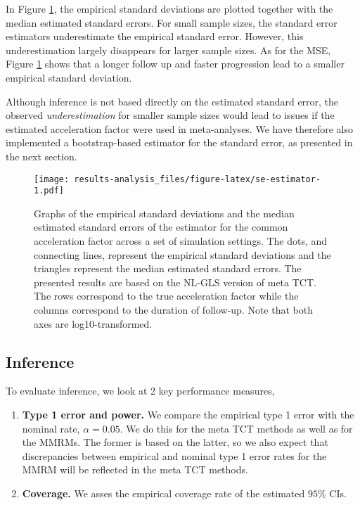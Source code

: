 \documentclass[
]{article}
\providecommand{\tightlist}{%
  \setlength{\itemsep}{0pt}\setlength{\parskip}{0pt}}
\begin{document}
In Figure \ref{fig:se-estimator}, the empirical standard deviations are plotted
together with the median estimated standard errors. For small sample sizes, the
standard error estimators underestimate the empirical standard error. However,
this underestimation largely disappears for larger sample sizes. As for the MSE,
Figure \ref{fig:se-estimator} shows that a longer follow up and faster
progression lead to a smaller empirical standard deviation.

Although inference is not based directly on the estimated standard error, the
observed
\emph{underestimation} for smaller sample sizes would lead to issues if the estimated acceleration factor were
used in meta-analyses. We have therefore also implemented a bootstrap-based
estimator for the standard error, as presented in the next section.

\begin{figure}
\centering
\texttt{[image: results-analysis\_files/figure-latex/se-estimator-1.pdf]}
\caption{\label{fig:se-estimator}Graphs of the empirical standard deviations and the median estimated standard errors of the estimator for the common acceleration factor across a set of simulation settings. The dots, and connecting lines, represent the empirical standard deviations and the triangles represent the median estimated standard errors. The presented results are based on the NL-GLS version of meta TCT. The rows correspond to the true acceleration factor while the columns correspond to the duration of follow-up. Note that both axes are log10-transformed.}
\end{figure}

\hypertarget{inference}{%
\subsection{Inference}\label{inference}}

To evaluate inference, we look at 2 key performance measures,

\begin{enumerate}
\def\labelenumi{\arabic{enumi}.}
\tightlist
\item
  \textbf{Type 1 error and power.} We compare the empirical type 1 error with the
  nominal rate, \(\alpha = 0.05\). We do this for the meta TCT methods as well as for
  the MMRMs. The former is based on the latter, so we also expect that discrepancies
  between empirical and nominal type 1 error rates for the MMRM will be reflected in
  the meta TCT methods.
\item
  \textbf{Coverage.} We asses the empirical coverage rate of the estimated \(95\%\)
  CIs.
\end{enumerate}
\end{document}
